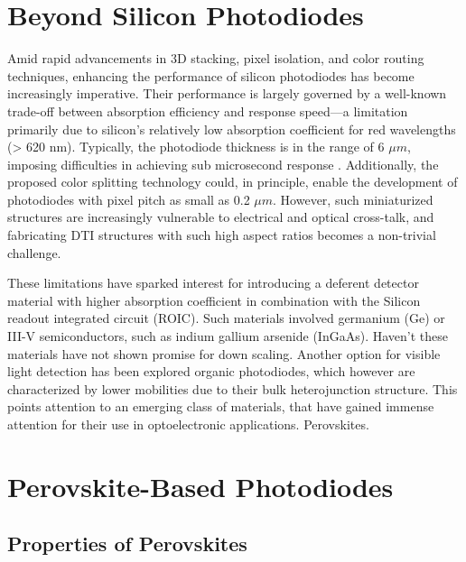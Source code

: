 \section{Beyond Silicon Photodiodes}

Amid rapid advancements in 3D stacking, pixel isolation, and color routing techniques, enhancing the performance of silicon photodiodes has become increasingly imperative. Their performance is largely governed by a well-known trade-off between absorption efficiency and response speed—a limitation primarily due to silicon's relatively low absorption coefficient for red wavelengths (> 620 nm). Typically, the photodiode thickness is in the range of 6 $\mu m$, imposing difficulties in achieving sub microsecond response \cite{Han2016ASensors}. Additionally, the proposed color splitting technology could, in principle, enable the development of photodiodes with pixel pitch as small as 0.2 $\mu m$. However, such miniaturized structures are increasingly vulnerable to electrical and optical cross-talk, and fabricating DTI structures with such high aspect ratios becomes a non-trivial challenge. 


These limitations have sparked interest for introducing a deferent detector material with higher absorption coefficient in combination with the Silicon readout integrated circuit (ROIC). Such materials involved germanium (Ge) or III-V semiconductors, such as indium gallium arsenide (InGaAs). Haven't these materials have not shown promise for down scaling. Another option for visible light detection has been explored organic photodiodes, which however are characterized by lower mobilities due to their bulk heterojunction structure. This points attention to an emerging class of materials, that have gained immense attention for their use in optoelectronic applications. Perovskites. 


\section{Perovskite-Based Photodiodes}

\subsection{Properties of Perovskites}

